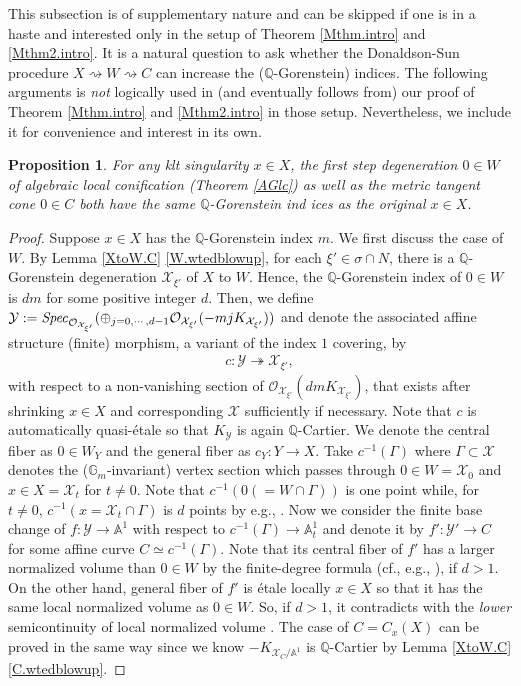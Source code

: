 \documentclass[12pt,a4paper]{amsart}
\newtheorem{Prop}[Thm]{Proposition}
\theoremstyle{remark}
\theoremstyle{definition}
\def\G{\mathbb{G}}
\def\Q{\mathbb{Q}}
\def\A{\mathbb{A}}
\def\X{\mathcal{X}}
\def\Y{\mathcal{Y}}
\begin{document}
This subsection is of supplementary nature and can be skipped if one is 
in a haste and interested only in the setup of Theorem \ref{Mthm.intro} 
and \ref{Mthm2.intro}. 
It is a natural question to ask whether the Donaldson-Sun procedure 
$X\rightsquigarrow W\rightsquigarrow C$ can increase the 
($\Q$-Gorenstein) indices. 
The following arguments is {\it not} logically used in 
(and eventually follows from) 
our proof of Theorem \ref{Mthm.intro} and  \ref{Mthm2.intro} in those 
setup. Nevertheless, 
we include it for convenience and interest in its own. 

\begin{Prop}\label{QG.ind}
For any klt singularity $x\in X$, the first step degeneration 
$0\in W$ 
of algebraic local conification (Theorem \ref{AGlc}) 
as well as the metric tangent cone $0\in C$ both 
have the same $\Q$-Gorenstein ind%
ices as the original 
$x\in X$. 
\end{Prop}
 
 
 \begin{proof}
Suppose $x\in X$ has the $\Q$-Gorenstein index $m$. 
We first discuss the case of $W$. 
By Lemma \ref{XtoW.C} \eqref{W.wtedblowup}, 
for each $\xi'\in \sigma\cap N$, 
there is a $\Q$-Gorenstein degeneration 
$\X_{\xi'}$ of $X$ to $W$. Hence, 
the $\Q$-Gorenstein index of $0\in W$ 
is $dm$ for some positive integer $d$. 
Then, we define 
$\mathcal{Y}:={\it Spec}_{\mathcal{O}_{\X_{\xi'}}}
(\oplus_{j=0,\cdots,d-1}\mathcal{O}_{\X_{\xi'}}(-mjK_{\X_{\xi'}}))$ and 
denote the associated affine structure (finite) morphism, 
a variant of the 
index $1$ covering, by 
\begin{align}
c\colon 
\mathcal{Y}\twoheadrightarrow \X_{\xi'}, 
\end{align}
with respect to a non-vanishing section of $\mathcal{O}_{\X_{\xi'}}(dmK_{\X_{\xi'}})$, that exists 
after shrinking $x\in X$ and corresponding $\X$ sufficiently 
if necessary. 
Note that $c$ is automatically quasi-\'etale so that 
$K_{\mathcal{Y}}$ is again $\Q$-Cartier. 
We denote the central fiber as 
$0\in W_Y$ and the general fiber as 
$c_Y\colon Y\to X$. Take $c^{-1}(\Gamma)$ 
where $\Gamma\subset \mathcal{X}$ denotes the 
($\G_m$-invariant) vertex section 
which passes through $0\in W=\X_0$ and $x\in X=\X_t$ for $t\neq 0$. 
Note that $c^{-1}(0(=W\cap \Gamma))$ is one point 
while, for $t\neq 0$, $c^{-1}(x=\X_t\cap \Gamma)$ 
is $d$ points by e.g., \cite[2.48(i), Lemma 9.52]{Kol13}. 
Now we consider the finite base change 
of $f\colon \Y\to \A^1$ with respect to 
$c^{-1}(\Gamma)\to \A^1_t$ and denote it by 
$f'\colon \mathcal{Y}'\to C$ for some affine curve $C\simeq c^{-1}(\Gamma)$. 
Note that its central fiber of $f'$ has a 
larger normalized volume than 
$0\in W$ by the finite-degree formula 
(cf., e.g., \cite[Theorem 1.3]{XZ}), 
if $d>1$. 
On the other hand, general fiber of $f'$ 
is \'etale locally 
$x\in X$ so that it has the same local 
normalized volume as $0\in W$. 
So, if $d>1$, it contradicts with the {\it lower} semicontinuity 
of local normalized volume \cite[Theorem 1]{BlumLiu}. 
The case of $C=C_x(X)$ can be proved in the same way since 
we know $-K_{\X_C/\A^1}$ is $\Q$-Cartier by Lemma \ref{XtoW.C} 
\eqref{C.wtedblowup}. 
 \end{proof}
\end{document}
